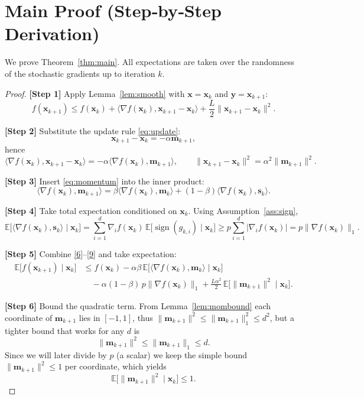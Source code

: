 \documentclass{article}
\newcommand{\sgn}{\operatorname{sign}}
\begin{document}
\section*{Main Proof (Step‑by‑Step Derivation)}
We prove Theorem~\ref{thm:main}.  All expectations are taken over the randomness of the stochastic gradients up to iteration $k$.

\begin{proof}
\textbf{[Step 1]} Apply Lemma~\ref{lem:smooth} with $\mathbf{x}=\mathbf{x}_{k}$ and $\mathbf{y}=\mathbf{x}_{k+1}$:
\[
f(\mathbf{x}_{k+1})\le f(\mathbf{x}_{k})+\langle\nabla f(\mathbf{x}_{k}),\mathbf{x}_{k+1}-\mathbf{x}_{k}\rangle
+\frac{L}{2}\|\mathbf{x}_{k+1}-\mathbf{x}_{k}\|^{2}.
\tag{6}
\]

\textbf{[Step 2]} Substitute the update rule \eqref{eq:update}:
\[
\mathbf{x}_{k+1}-\mathbf{x}_{k}= -\alpha\mathbf{m}_{k+1},
\]
hence
\[
\langle\nabla f(\mathbf{x}_{k}),\mathbf{x}_{k+1}-\mathbf{x}_{k}\rangle
= -\alpha\langle\nabla f(\mathbf{x}_{k}),\mathbf{m}_{k+1}\rangle,
\qquad
\|\mathbf{x}_{k+1}-\mathbf{x}_{k}\|^{2}= \alpha^{2}\|\mathbf{m}_{k+1}\|^{2}.
\tag{7}
\]

\textbf{[Step 3]} Insert \eqref{eq:momentum} into the inner product:
\[
\langle\nabla f(\mathbf{x}_{k}),\mathbf{m}_{k+1}\rangle
= \beta\langle\nabla f(\mathbf{x}_{k}),\mathbf{m}_{k}\rangle
+ (1-\beta)\langle\nabla f(\mathbf{x}_{k}),\mathbf{s}_{k}\rangle.
\tag{8}
\]

\textbf{[Step 4]} Take total expectation conditioned on $\mathbf{x}_{k}$.
Using Assumption~\ref{ass:sign},
\[
\mathbb{E}\big[\langle\nabla f(\mathbf{x}_{k}),\mathbf{s}_{k}\rangle\mid\mathbf{x}_{k}\big]
= \sum_{i=1}^{d}\nabla_{i}f(\mathbf{x}_{k})\,
\mathbb{E}\big[\sgn(g_{k,i})\mid\mathbf{x}_{k}\big]
\ge p\sum_{i=1}^{d}|\nabla_{i}f(\mathbf{x}_{k})|
= p\|\nabla f(\mathbf{x}_{k})\|_{1}.
\tag{9}
\]

\textbf{[Step 5]} Combine \eqref{6}–\eqref{9} and take expectation:
\[
\begin{aligned}
\mathbb{E}\big[f(\mathbf{x}_{k+1})\mid\mathbf{x}_{k}\big]
&\le f(\mathbf{x}_{k})
-\alpha\beta\,\mathbb{E}\big[\langle\nabla f(\mathbf{x}_{k}),\mathbf{m}_{k}\rangle\mid\mathbf{x}_{k}\big] \\
&\quad -\alpha(1-\beta)\,p\|\nabla f(\mathbf{x}_{k})\|_{1}
+\frac{L\alpha^{2}}{2}\,\mathbb{E}\big[\|\mathbf{m}_{k+1}\|^{2}\mid\mathbf{x}_{k}\big].
\end{aligned}
\tag{10}
\]

\textbf{[Step 6]} Bound the quadratic term.  From Lemma~\ref{lem:mombound} each coordinate of $\mathbf{m}_{k+1}$ lies in $[-1,1]$, thus $\|\mathbf{m}_{k+1}\|^{2}\le \|\mathbf{m}_{k+1}\|_{1}^{2}\le d^{2}$, but a tighter bound that works for any $d$ is
\[
\|\mathbf{m}_{k+1}\|^{2}\le \|\mathbf{m}_{k+1}\|_{1}\le d.
\]
Since we will later divide by $p$ (a scalar) we keep the simple bound $\|\mathbf{m}_{k+1}\|^{2}\le 1$ per coordinate, which yields
\[
\mathbb{E}\big[\|\mathbf{m}_{k+1}\|^{2}\mid\mathbf{x}_{k}\big]\le 1.
\tag{11}
\]


\end{proof}
\end{document}

